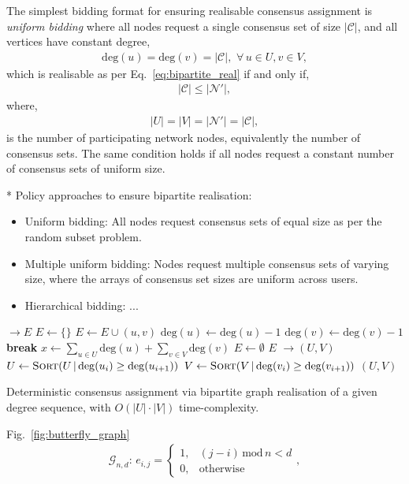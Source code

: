 The simplest bidding format for ensuring realisable consensus assignment is \emph{uniform bidding} where all nodes request a single consensus set of size $|\mathcal{C}|$, and all vertices have constant degree,
\begin{align}
	\mathrm{deg}(u) = \mathrm{deg}(v)= |\mathcal{C}|,\,\,\forall\, u\in U, v\in V,
\end{align}
which is realisable as per Eq.~\eqref{eq:bipartite_real} if and only if,
\begin{align}
	|\mathcal{C}| \leq |\mathcal{N}'|,
\end{align}
where,
\begin{align}
	|U|=|V|=|\mathcal{N}'|=|\mathcal{C}|,
\end{align}
is the number of participating network nodes, equivalently the number of consensus sets. The same condition holds if all nodes request a constant number of consensus sets of uniform size.

* Policy approaches to ensure bipartite realisation:
\begin{itemize}
	\item Uniform bidding: All nodes request consensus sets of equal size as per the random subset problem.
	\item Multiple uniform bidding: Nodes request multiple consensus sets of varying size, where the arrays of consensus set sizes are uniform across users.
	\item Hierarchical bidding: ...
\end{itemize}

\begin{algorithm}[H]
	\begin{algorithmic}
		 $\to E$
		\State $E \gets \{\}$ 
		 
		\State $E \gets E \cup (u,v)$ 
		\State $\mathrm{deg}(u) \gets \mathrm{deg}(u)-1$ 
		\State $\mathrm{deg}(v) \gets \mathrm{deg}(v)-1$
		\State \textbf{break}
		\EndIf
		\EndIf
		\EndFor
		\EndIf
		\EndFor
		\State $x \gets \sum_{u\in U} \mathrm{deg}(u) + \sum_{v\in V} \mathrm{deg}(v)$ 
		\State $E \gets \emptyset$ 
		\EndIf
		\State \Return $E$
		\EndFunction
		\State
		 $\to (U,V)$
		\State $U \gets \textsc{Sort}(U \,|\, \mathrm{deg}(u_i)\geq\mathrm{deg}(u_{i+1}))$ 
		\State $V \gets \textsc{Sort}(V \,|\, \mathrm{deg}(v_i)\geq\mathrm{deg}(v_{i+1}))$ 
		\State \Return $(U,V)$
		\EndFunction
	\end{algorithmic}
	\caption{\cite{Havel1955, Hakimi62} Deterministic consensus assignment via bipartite graph realisation of a given degree sequence, with \mbox{$O(|U|\cdot |V|)$} time-complexity.} \label{alg:initial_assignment}
\end{algorithm}

Fig.~\ref{fig:butterfly_graph}
\begin{align}
	\mathcal{G}_{n,d}:\, e_{i,j} = \begin{cases}
		                               1, & (j-i)\, \mathrm{mod}\, n < d \\
		                               0, & \mathrm{otherwise}
	                               \end{cases},
\end{align}


